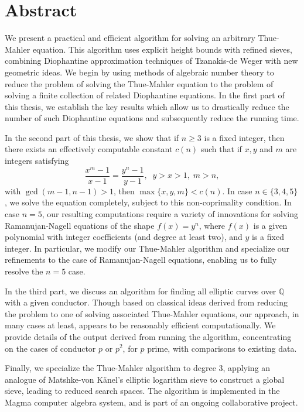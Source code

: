 
\chapter{Abstract}

We present a practical and efficient algorithm for solving an arbitrary Thue-Mahler equation. This algorithm uses explicit height bounds with refined sieves, combining Diophantine approximation techniques of Tzanakis-de Weger with new geometric ideas. We begin by using methods of algebraic number theory to reduce the problem of solving the Thue-Mahler equation to the problem of solving a finite collection of related Diophantine equations. In the first part of this thesis, we establish the key results which allow us to drastically reduce the number of such Diophantine equations and subsequently reduce the running time. 

In the second part of this thesis, we show that if $n \geq 3$ is a fixed integer, then there exists an effectively computable constant $c (n)$ such that if $x, y$ and $m$ are integers satisfying
$$
\frac{x^m-1}{x-1} = \frac{y^n-1}{y-1}, \; \; y>x>1, \; m > n,
$$
with $\gcd(m-1,n-1)>1$,
then $\max \{ x, y, m \} < c (n)$. In case $n \in \{ 3, 4, 5 \}$, we solve the equation completely, subject to this non-coprimality condition.  In case $n=5$, our resulting computations require a variety of innovations for solving Ramanujan-Nagell equations of the shape $f(x)=y^n$, where $f(x)$ is a given polynomial with integer coefficients (and degree at least two), and $y$ is a fixed integer. In particular, we modify our Thue-Mahler algorithm and specialize our refinements to the case of Ramanujan-Nagell equations, enabling us to fully resolve the $n = 5$ case. 

In the third part, we discuss an algorithm for finding all elliptic curves over $\mathbb{Q}$ with a given conductor. Though based on 
classical ideas derived from reducing the problem to one of solving associated Thue-Mahler equations,  our approach, in many cases at least, appears to be reasonably efficient  computationally. We provide 
details of the output derived from running the algorithm, concentrating on the cases of conductor $p$ or $p^2$, for $p$ prime, with comparisons to existing 
data. 

Finally, we specialize the Thue-Mahler algorithm to degree $3$, applying an analogue of Matshke-von K\"anel's elliptic logarithm sieve to construct a global sieve, leading to reduced search spaces. The algorithm is implemented in the Magma computer algebra system, and is part of an ongoing collaborative project. 



